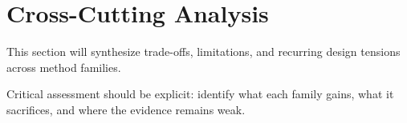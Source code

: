 \section{Cross-Cutting Analysis}

This section will synthesize trade-offs, limitations, and recurring design tensions across method families.

Critical assessment should be explicit: identify what each family gains, what it sacrifices, and where the evidence remains weak.

